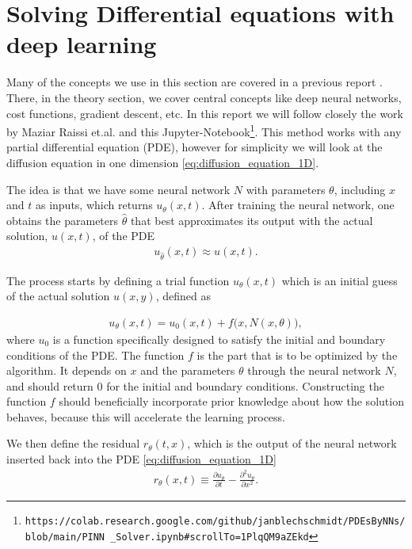 \documentclass[12pt]{extarticle}
\begin{document}
\section{Solving Differential equations with deep learning}
Many of the concepts we use in this section are covered in a previous report \cite{project2}. There, in the theory section, we cover central concepts like deep neural networks, cost functions, gradient descent, etc. In this report we will follow closely the work by Maziar Raissi et.al. \cite{raissi2017physics} and this Jupyter-Notebook\footnote{\texttt{https://colab.research.google.com/github/janblechschmidt/PDEsByNNs/blob/main/PINN \_Solver.ipynb\#scrollTo=1PlqQM9aZEkd}}. This method works with any partial differential equation (PDE), however for simplicity we will look at the diffusion equation in one dimension \eqref{eq:diffusion_equation_1D}. 

The idea is that we have some neural network $N$ with parameters $\theta$, including $x$ and $t$ as inputs, which returns $u_{\theta}(x,t)$. After training the neural network, one obtains the parameters $\hat{\theta}$ that best approximates its output with the actual solution, $u(x,t)$, of the PDE
\begin{align*}
	u_{\hat{\theta}} (x, t) \approx u(x, t).
\end{align*}

The process starts by defining a trial function $u_{\theta}(x,t)$ which is an initial guess of the actual solution $u(x,y)$, defined as

\begin{align}
	u_{\theta}(x,t) = u_0(x, t) + f\big(x, N(x,\theta)\big),
	\label{eq:NN_model}
\end{align}
where $u_0$ is a function specifically designed to satisfy the initial and boundary conditions of the PDE. The function $f$ is the part that is to be optimized by the algorithm. It depends on $x$ and the parameters $\theta$ through the neural network $N$, and should return 0 for the initial and boundary conditions. Constructing the function $f$ should beneficially incorporate prior knowledge about how the solution behaves, because this will accelerate the learning process.

\par We then define the residual $r_\theta(t, x)$, which is the output of the neural network inserted back into the PDE \eqref{eq:diffusion_equation_1D}
\begin{align}
	r_\theta(x, t) \equiv \frac{\partial u_\theta}{\partial t} - \frac{\partial^2 u_\theta}{\partial x^2}.
	\label{eq:residual}
\end{align}
\end{document}
